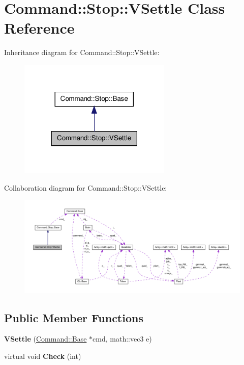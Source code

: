 \hypertarget{classCommand_1_1Stop_1_1VSettle}{\section{\-Command\-:\-:\-Stop\-:\-:\-V\-Settle \-Class \-Reference}
\label{classCommand_1_1Stop_1_1VSettle}
}


\-Inheritance diagram for \-Command\-:\-:\-Stop\-:\-:\-V\-Settle\-:\nopagebreak
\begin{figure}[H]
\begin{center}
\leavevmode
\includegraphics[width=206pt]{classCommand_1_1Stop_1_1VSettle__inherit__graph}
\end{center}
\end{figure}


\-Collaboration diagram for \-Command\-:\-:\-Stop\-:\-:\-V\-Settle\-:\nopagebreak
\begin{figure}[H]
\begin{center}
\leavevmode
\includegraphics[width=350pt]{classCommand_1_1Stop_1_1VSettle__coll__graph}
\end{center}
\end{figure}
\subsection*{\-Public \-Member \-Functions}
\begin{DoxyCompactItemize}
\item 
\hypertarget{classCommand_1_1Stop_1_1VSettle_a07fd40d6e22d9368ccd2a471f5ba3f07}{{\bfseries \-V\-Settle} (\hyperlink{classCommand_1_1Base}{\-Command\-::\-Base} $\ast$cmd, math\-::vec3 e)}\label{classCommand_1_1Stop_1_1VSettle_a07fd40d6e22d9368ccd2a471f5ba3f07}

\item 
\hypertarget{classCommand_1_1Stop_1_1VSettle_aa8632c09f01cb9427d33571001522fa8}{virtual void {\bfseries \-Check} (int)}\label{classCommand_1_1Stop_1_1VSettle_aa8632c09f01cb9427d33571001522fa8}

\end{DoxyCompactItemize}
